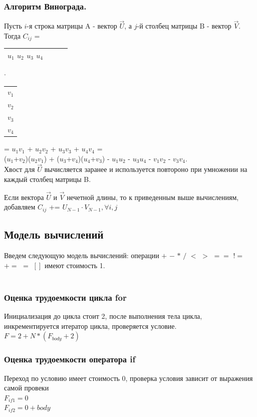 \documentclass[12pt]{article}
\begin{document}
\subsubsection{Алгоритм Винограда.}
Пусть $i$-я строка матрицы A - вектор  $\vec{U}$, а $j$-й столбец матрицы B - вектор $\vec{V}$. \\
Тогда $C_{ij}$ = \begin{tabular}{|c|c|c|c|}
	\hline
	$u_{1}$  $u_{2}$  $u_{3}$  $u_{4}$ \\
	\hline
\end{tabular} $\cdot$ 
\begin{tabular}{|c|}
	\hline
	$v_{1}$ \\
	$v_{2}$  \\
	$v_{3}$   \\
	$v_{4}$  \\
	\hline
\end{tabular}
= $u_{1}$$v_{1}$ + $u_{2}$$v_{2}$ + $u_{3}$$v_{3}$ + $u_{4}$$v_{4}$ = \\
($u_{1}$+$v_{2}$)($u_{2}$$v_{1}$) + ($u_{3}$+$v_{4}$)($u_{4}$+$v_{3}$) - $u_{1}$$u_{2}$ - $u_{3}$$u_{4}$ - $v_{1}$$v_{2}$ - $v_{3}$$v_{4}$. \\

Хвост для  $\vec{U}$ вычисляется заранее и используется повтороно при умножении на каждый столбец матрицы B.

Если вектора $\vec{U}$ и $\vec{V}$ нечетной длины, то к приведенным выше вычислениям, добавляем 
$C_{ij}$ += $U_{N-1}\cdot V_{N-1}, \forall i,j$
\\

\subsection{Модель вычислений}
Введем следующую модель вычислений:
операции $+$  $-$  $*$  $/$  $<$  $>$  $==$  $!=$  $+=$  $=$  $[]$  имеют стоимость 1.
\\
\\
\subsubsection{Оценка трудоемкости цикла for}
Инициализация до цикла стоит 2, после выполнения тела цикла, инкрементируется итератор цикла, проверяется условие.
\\
$F = 2 + N*(F_{body} + 2)$

\subsubsection{Оценка трудоемкости оператора if}
Переход по условию имеет стоимость 0, проверка условия зависит от выражения самой провеки
\\
{$F_{if1} =0$\\$F_{if2} = 0 + body$}
\end{document}
